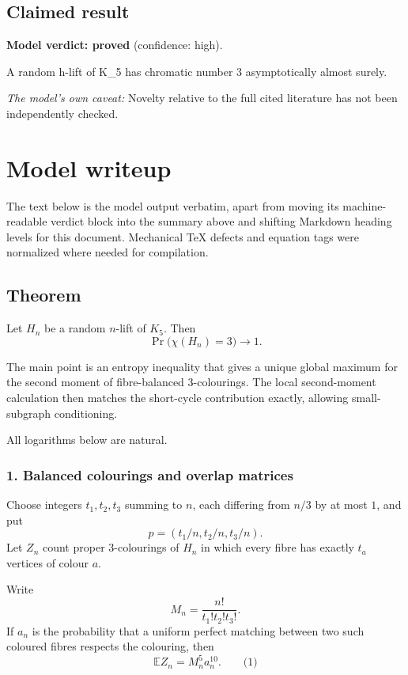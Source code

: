 \documentclass[
  11pt,
  a4paper,
]{article}
\begin{document}
\subsection{Claimed result}\label{claimed-result}

\textbf{Model verdict: proved} (confidence: high).

A random h-lift of K\_5 has chromatic number 3 asymptotically almost
surely.

\emph{The model's own caveat:} Novelty relative to the full cited
literature has not been independently checked.

\section{Model writeup}\label{model-writeup}

The text below is the model output verbatim, apart from moving its
machine-readable verdict block into the summary above and shifting
Markdown heading levels for this document. Mechanical TeX defects and
equation tags were normalized where needed for compilation.

\subsection{Theorem}\label{theorem}

Let \(H_n\) be a random \(n\)-lift of \(K_5\). Then \[
\Pr\bigl(\chi(H_n)=3\bigr)\longrightarrow 1.
\]

The main point is an entropy inequality that gives a unique global
maximum for the second moment of fibre-balanced 3-colourings. The local
second-moment calculation then matches the short-cycle contribution
exactly, allowing small-subgraph conditioning.

All logarithms below are natural.

\subsubsection{1. Balanced colourings and overlap
matrices}\label{balanced-colourings-and-overlap-matrices}

Choose integers \(t_1,t_2,t_3\) summing to \(n\), each differing from
\(n/3\) by at most \(1\), and put \[
p=(t_1/n,t_2/n,t_3/n).
\] Let \(Z_n\) count proper 3-colourings of \(H_n\) in which every fibre
has exactly \(t_a\) vertices of colour \(a\).

Write \[
M_n=\frac{n!}{t_1!t_2!t_3!}.
\] If \(a_n\) is the probability that a uniform perfect matching between
two such coloured fibres respects the colouring, then \[
\mathbb E Z_n=M_n^5a_n^{10}.                                      \qquad\text{(1)}
\]
\end{document}

